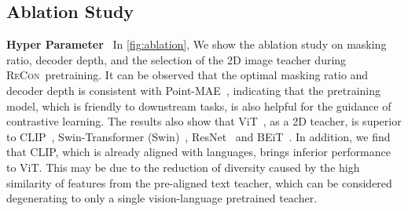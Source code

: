 \documentclass{article}
\theoremstyle{plain}
\theoremstyle{definition}
\theoremstyle{remark}
\def\recon{{\scshape ReCon}}
\begin{document}
\begin{table}[!t]
\caption{\textbf{Ablation study on pretraining targets}. Overall accuracy (\%) without voting is reported.} \label{tab:target}
\begin{center}
\vspace{-15pt}
\end{center}
\end{table} \vspace{-3pt}
\subsection{Ablation Study}\label{sec:ablation}
\textbf{Hyper Parameter}~
In \cref{fig:ablation}, We show the ablation study on masking ratio, decoder depth, and the selection of the 2D image teacher during \recon\ pretraining. 
It can be observed that the optimal masking ratio and decoder depth is consistent with Point-MAE~\citep{PointMAE}, indicating that the pretraining model, which is friendly to downstream tasks, is also helpful for the guidance of contrastive learning.
The results also show that ViT~\citep{ViT}, as a 2D teacher, is superior to CLIP~\citep{CLIP}, Swin-Transformer (Swin)~\citep{SwinT}, ResNet~\citep{ResNet16} and BEiT~\citep{BEiT}. 
In addition, we find that CLIP, which is already aligned with languages, brings inferior performance to ViT.
This may be due to the reduction of diversity caused by the high similarity of features from the pre-aligned text teacher, which can be considered degenerating to only a single vision-language pretrained teacher.
\end{document}
